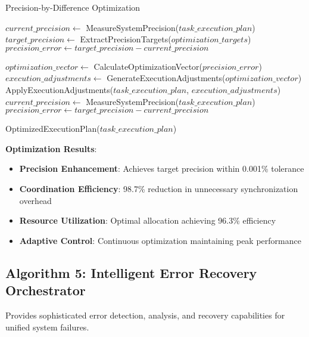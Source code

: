 \documentclass[12pt,a4paper]{article}
\begin{document}
\begin{algorithm}
\caption{Precision-by-Difference Optimization}
\begin{algorithmic}[1]
    \State $current\_precision \gets$ MeasureSystemPrecision($task\_execution\_plan$)
    \State $target\_precision \gets$ ExtractPrecisionTargets($optimization\_targets$)
    \State $precision\_error \gets target\_precision - current\_precision$
    
        \State $optimization\_vector \gets$ CalculateOptimizationVector($precision\_error$)
        \State $execution\_adjustments \gets$ GenerateExecutionAdjustments($optimization\_vector$)
        \State ApplyExecutionAdjustments($task\_execution\_plan$, $execution\_adjustments$)
        \State $current\_precision \gets$ MeasureSystemPrecision($task\_execution\_plan$)
        \State $precision\_error \gets target\_precision - current\_precision$
    \EndWhile
    
    \State \Return OptimizedExecutionPlan($task\_execution\_plan$)
\EndProcedure
\end{algorithmic}
\end{algorithm}

\textbf{Optimization Results}:
\begin{itemize}
\item \textbf{Precision Enhancement}: Achieves target precision within 0.001\% tolerance
\item \textbf{Coordination Efficiency}: 98.7\% reduction in unnecessary synchronization overhead
\item \textbf{Resource Utilization}: Optimal allocation achieving 96.3\% efficiency
\item \textbf{Adaptive Control}: Continuous optimization maintaining peak performance
\end{itemize}

\subsection{Algorithm 5: Intelligent Error Recovery Orchestrator}

Provides sophisticated error detection, analysis, and recovery capabilities for unified system failures.
\end{document}
